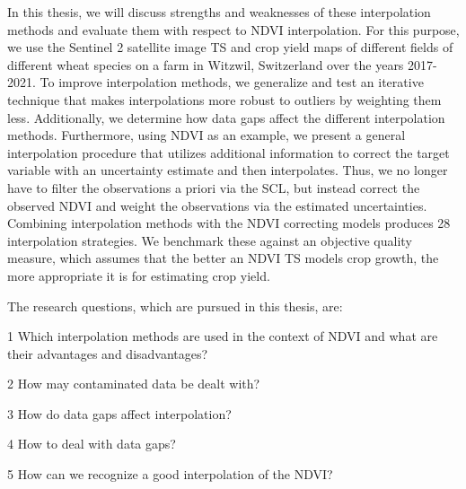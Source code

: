 

In this thesis, we will discuss strengths and weaknesses of these interpolation methods and evaluate them with respect to NDVI interpolation. For this purpose, we use the Sentinel 2 satellite image {TS} and crop yield maps of different fields of different wheat species on a farm in Witzwil, Switzerland over the years 2017-2021.
To improve interpolation methods, we generalize and test an iterative technique that makes interpolations more robust to outliers by weighting them less. Additionally, we determine how data gaps affect the different interpolation methods. Furthermore, using NDVI as an example, we present a general interpolation procedure that utilizes additional information to correct the target variable with an uncertainty estimate and then interpolates. Thus, we no longer have to filter the observations a priori via the SCL, but instead correct the observed NDVI and weight the observations via the estimated uncertainties. Combining interpolation methods with the NDVI correcting models produces 28 interpolation strategies. We benchmark these against an objective quality measure, which assumes that the better an NDVI TS models crop growth, the more appropriate it is for estimating crop yield.


\bigskip The research questions, which are pursued in this thesis, are:
\begin{Nenumerate}
    \item 1 Which interpolation methods are used in the context of NDVI and what are their advantages and disadvantages?
\item 2 How may contaminated data be dealt with?
    \item 3 How do data gaps affect interpolation?
\item 4 How to deal with data gaps?
    \item 5 How can we recognize a good interpolation of the NDVI?
\end{Nenumerate}

